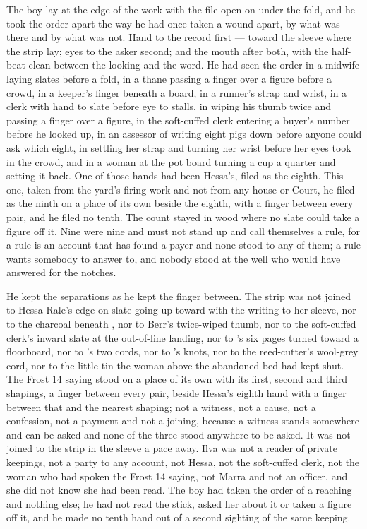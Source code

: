 The boy lay at the edge of the work with the file open on  under the fold, and he took the order apart the way he had once taken a wound apart, by what was there and by what was not. Hand to the record first --- toward the sleeve where the strip lay; eyes to the asker second; and the mouth after both, with the half-beat clean between the looking and the word. He had seen the order in a midwife laying slates before a fold, in a thane passing a finger over a figure before a crowd, in a keeper's finger beneath a board, in a runner's strap and wrist, in a clerk with hand to slate before eye to stalls, in  wiping his thumb twice and passing a finger over a figure, in the soft-cuffed clerk entering a buyer's number before he looked up, in an assessor of  writing eight pigs down before anyone could ask which eight, in  settling her strap and turning her wrist before her eyes took in the crowd, and in a woman at the pot board turning a cup a quarter and setting it back. One of those hands had been Hessa's, filed as the eighth. This one, taken from the yard's firing work and not from any house or Court, he filed as the ninth on a place of its own beside the eighth, with a finger between every pair, and he filed no tenth. The count stayed in wood where no slate could take a figure off it. Nine were nine and must not stand up and call themselves a rule, for a rule is an account that has found a payer and none stood to any of them; a rule wants somebody to answer to, and nobody stood at the well who would have answered for the notches.

He kept the separations as he kept the finger between. The strip was not joined to Hessa Rale's edge-on slate going up  toward  with the writing to her sleeve, nor to the charcoal beneath , nor to Berr's twice-wiped thumb, nor to the soft-cuffed clerk's inward slate at the out-of-line landing, nor to 's six pages turned toward a floorboard, nor to 's two cords, nor to 's knots, nor to the reed-cutter's wool-grey cord, nor to the little tin the woman above the abandoned bed had kept shut. The Frost 14 saying stood on a place of its own with its first, second and third shapings, a finger between every pair, beside Hessa's eighth hand with a finger between that and the nearest shaping; not a witness, not a cause, not a confession, not a payment and not a joining, because a witness stands somewhere and can be asked and none of the three stood anywhere to be asked. It was not joined to the strip in the sleeve a pace away. Ilva was not a reader of private keepings, not a party to any account, not Hessa, not the soft-cuffed clerk, not the woman who had spoken the Frost 14 saying, not Marra and not an officer, and she did not know she had been read. The boy had taken the order of a reaching and nothing else; he had not read the stick, asked her about it or taken a figure off it, and he made no tenth hand out of a second sighting of the same keeping.

